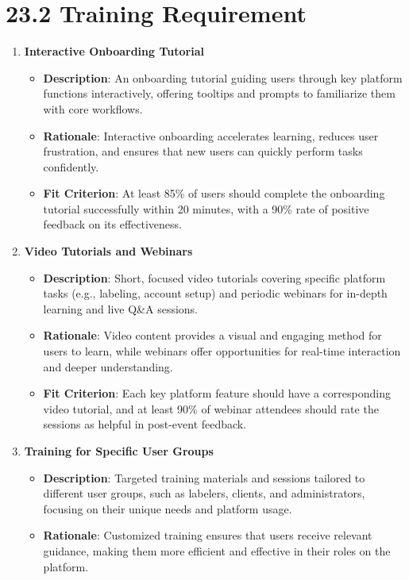 \documentclass[12pt]{article}
\begin{document}
\section*{23.2 Training Requirement}

\begin{enumerate}
    \item \textbf{Interactive Onboarding Tutorial}  
        \begin{itemize} 
            \item \textbf{Description}: An onboarding tutorial guiding users through key platform functions interactively, offering tooltips and prompts to familiarize them with core workflows.  
            \item \textbf{Rationale}: Interactive onboarding accelerates learning, reduces user frustration, and ensures that new users can quickly perform tasks confidently.  
            \item \textbf{Fit Criterion}: At least 85\% of users should complete the onboarding tutorial successfully within 20 minutes, with a 90\% rate of positive feedback on its effectiveness.
        \end{itemize}
    \item \textbf{Video Tutorials and Webinars}  
        \begin{itemize} 
            \item \textbf{Description}: Short, focused video tutorials covering specific platform tasks (e.g., labeling, account setup) and periodic webinars for in-depth learning and live Q\&A sessions.  
            \item \textbf{Rationale}: Video content provides a visual and engaging method for users to learn, while webinars offer opportunities for real-time interaction and deeper understanding.  
            \item \textbf{Fit Criterion}: Each key platform feature should have a corresponding video tutorial, and at least 90\% of webinar attendees should rate the sessions as helpful in post-event feedback.
        \end{itemize}
    \item \textbf{Training for Specific User Groups}  
        \begin{itemize} 
            \item \textbf{Description}: Targeted training materials and sessions tailored to different user groups, such as labelers, clients, and administrators, focusing on their unique needs and platform usage.  
            \item \textbf{Rationale}: Customized training ensures that users receive relevant guidance, making them more efficient and effective in their roles on the platform.  

\end{itemize}
\end{enumerate}
\end{document}

